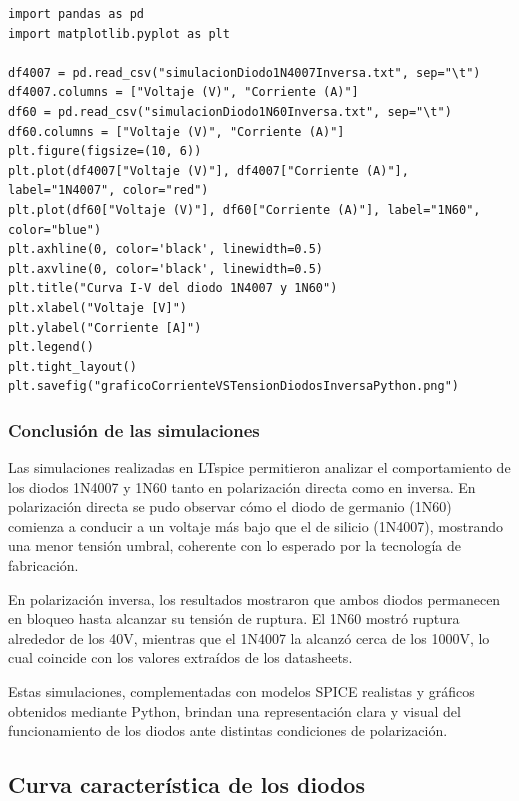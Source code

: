\begin{verbatim}
import pandas as pd 
import matplotlib.pyplot as plt 

df4007 = pd.read_csv("simulacionDiodo1N4007Inversa.txt", sep="\t")
df4007.columns = ["Voltaje (V)", "Corriente (A)"]
df60 = pd.read_csv("simulacionDiodo1N60Inversa.txt", sep="\t")
df60.columns = ["Voltaje (V)", "Corriente (A)"]
plt.figure(figsize=(10, 6))
plt.plot(df4007["Voltaje (V)"], df4007["Corriente (A)"], label="1N4007", color="red")
plt.plot(df60["Voltaje (V)"], df60["Corriente (A)"], label="1N60", color="blue")
plt.axhline(0, color='black', linewidth=0.5)
plt.axvline(0, color='black', linewidth=0.5)
plt.title("Curva I-V del diodo 1N4007 y 1N60")
plt.xlabel("Voltaje [V]")
plt.ylabel("Corriente [A]")
plt.legend()
plt.tight_layout()
plt.savefig("graficoCorrienteVSTensionDiodosInversaPython.png")
\end{verbatim}


\finalCodigo{}

\subsubsection{Conclusión de las simulaciones}
\sangria{} Las simulaciones realizadas en LTspice permitieron analizar el comportamiento de los diodos 1N4007 y 1N60 tanto en polarización directa como en inversa. En polarización directa se pudo observar cómo el diodo de germanio (1N60) comienza a conducir a un voltaje más bajo que el de silicio (1N4007), mostrando una menor tensión umbral, coherente con lo esperado por la tecnología de fabricación.

\sangria{} En polarización inversa, los resultados mostraron que ambos diodos permanecen en bloqueo hasta alcanzar su tensión de ruptura. El 1N60 mostró ruptura alrededor de los 40V, mientras que el 1N4007 la alcanzó cerca de los 1000V, lo cual coincide con los valores extraídos de los datasheets.

\sangria{} Estas simulaciones, complementadas con modelos SPICE realistas y gráficos obtenidos mediante Python, brindan una representación clara y visual del funcionamiento de los diodos ante distintas condiciones de polarización.

\subsection{Curva característica de los diodos}

